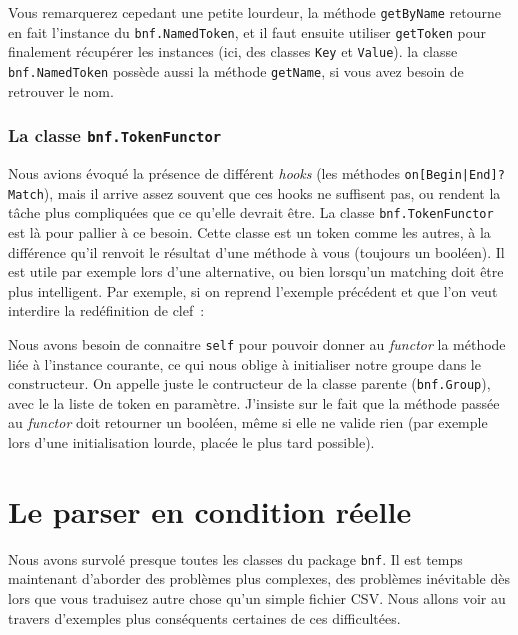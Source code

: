 \documentclass[a4paper]{article}
\newcommand{\insertpython}[1]{%
{\ttfamily}%
}
\newcommand{\fixed}[1]{\texttt{#1}}
\begin{document}
                Vous remarquerez cepedant une petite lourdeur, la méthode \fixed{getByName}
                retourne en fait l'instance du \fixed{bnf.NamedToken}, et il faut ensuite
                utiliser \fixed{getToken} pour finalement récupérer les instances (ici, des
                classes \fixed{Key} et \fixed{Value}). la classe \fixed{bnf.NamedToken}
                possède aussi la méthode \fixed{getName}, si vous avez besoin de retrouver
                le nom.

            \subsubsection{La classe \fixed{bnf.TokenFunctor}}
                Nous avions évoqué la présence de différent \emph{hooks} (les méthodes \fixed{on[Begin|End]?Match}),
                mais il arrive assez souvent que ces hooks ne suffisent pas, ou rendent la tâche plus
                compliquées que ce qu'elle devrait être. La classe \fixed{bnf.TokenFunctor} est
                là pour pallier à ce besoin. Cette classe est un token comme les autres, à la différence qu'il
                renvoit le résultat d'une méthode à vous (toujours un booléen). Il est utile
                par exemple lors d'une alternative, ou bien lorsqu'un matching doit être plus intelligent.
                Par exemple, si on reprend l'exemple précédent et que l'on veut interdire la
                redéfinition de clef~:
                \insertpython{listings/bnf/ex08.py}
                Nous avons besoin de connaitre \fixed{self} pour pouvoir donner au \emph{functor} la
                méthode liée à l'instance courante, ce qui nous oblige à initialiser notre groupe dans
                le constructeur. On appelle juste le contructeur de la classe parente (\fixed{bnf.Group}),
                avec le la liste de token en paramètre. J'insiste sur le fait que la méthode passée
                au \emph{functor} doit retourner un booléen, même si elle ne valide rien (par
                exemple lors d'une initialisation lourde, placée le plus tard possible).
		

    \newpage
    \section{Le parser en condition réelle}
        Nous avons survolé presque toutes les classes du package \fixed{bnf}.
        Il est temps maintenant d'aborder des problèmes plus complexes, des
        problèmes inévitable dès lors que vous traduisez autre chose qu'un
        simple fichier CSV. Nous allons voir au travers d'exemples plus 
        conséquents certaines de ces difficultées.
\end{document}
